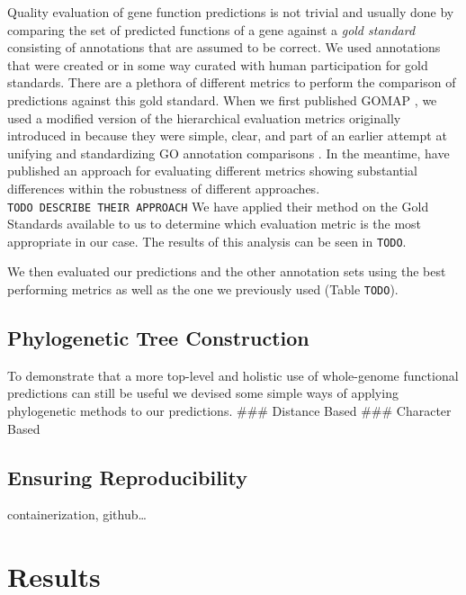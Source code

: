 \documentclass[utf8]{frontiersSCNS}
\begin{document}
Quality evaluation of gene function predictions is not trivial and usually done by comparing the set of predicted functions of a gene against a \emph{gold standard} consisting of annotations that are assumed to be correct.
We used annotations that were created or in some way curated with human participation for gold standards.
There are a plethora of different metrics to perform the comparison of predictions against this gold standard.
When we first published GOMAP \citep{Wimalanathan2018}, we used a modified version of the hierarchical evaluation metrics originally introduced in \citep{Verspoor2006} because they were simple, clear, and part of an earlier attempt at unifying and standardizing GO annotation comparisons \citep{Defoin-Platel2011}.
In the meantime, \citet{Plyusnin2019} have published an approach for evaluating different metrics showing substantial differences within the robustness of different approaches.
\texttt{TODO\ DESCRIBE\ THEIR\ APPROACH}
We have applied their method on the Gold Standards available to us to determine which evaluation metric is the most appropriate in our case.
The results of this analysis can be seen in \texttt{TODO}.

We then evaluated our predictions and the other annotation sets using the best performing metrics as well as the one we previously used (Table \texttt{TODO}).

\hypertarget{phylogenetic-tree-construction}{%
\subsection{Phylogenetic Tree Construction}\label{phylogenetic-tree-construction}}

To demonstrate that a more top-level and holistic use of whole-genome functional predictions can still be useful we devised some simple ways of applying phylogenetic methods to our predictions.
\#\#\# Distance Based
\#\#\# Character Based

\hypertarget{ensuring-reproducibility}{%
\subsection{Ensuring Reproducibility}\label{ensuring-reproducibility}}

containerization, github\ldots{}

\hypertarget{results}{%
\section{Results}\label{results}}
\end{document}
